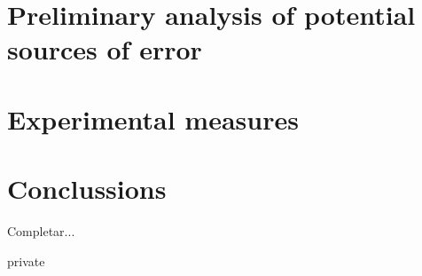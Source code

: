 \documentclass[11pt,a4paper]{report}
\begin{document}
%

\chapter{Preliminary analysis of potential sources of error}
%


\chapter{Experimental measures}


\chapter{Conclussions}
Completar...

\begin{shownto}{private}
\begin{appendices}
%
%
%
%
%
%
%
%
%
\end{appendices}
\end{shownto}
	

\end{document}
